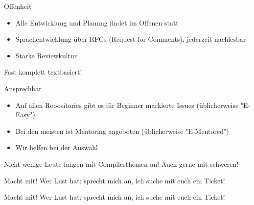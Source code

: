 \documentclass{beamer}
\begin{document}
\begin{frame}{Offenheit}
	\begin{itemize}
		\item Alle Entwicklung und Planung findet im Offenen statt
		\item Sprachentwicklung über RFCs (Request for Comments), jederzeit nachlesbar
		\item Starke Reviewkultur
	\end{itemize}

	Fast komplett textbasiert!
\end{frame}

\begin{frame}{Ansprechbar}
	\begin{itemize}
		\item Auf allen Repositories gibt es für Beginner markierte Issues (üblicherweise "E-Easy")
		\item Bei den meisten ist Mentoring angeboten (üblicherweise "E-Mentored")
		\item Wir helfen bei der Auswahl
	\end{itemize}

	Nicht wenige Leute fangen mit Compilerthemen an! Auch gerne mit schweren!
\end{frame}

\begin{frame}{Macht mit!}
	Wer Lust hat: sprecht mich an, ich suche mit euch ein Ticket!
\end{frame}


\begin{frame}{Macht mit!}
	Wer Lust hat: sprecht mich an, ich suche mit euch ein Ticket!
\end{frame}
\end{document}
